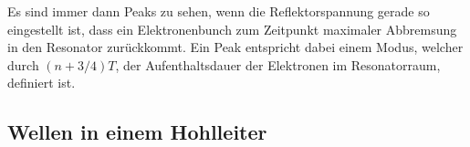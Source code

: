 Es sind immer dann Peaks zu sehen, wenn die Reflektorspannung gerade so eingestellt ist, dass ein Elektronenbunch zum Zeitpunkt maximaler Abbremsung in den Resonator zurückkommt.
Ein Peak entspricht dabei einem Modus, welcher durch $(n+3/4)T$, der Aufenthaltsdauer der Elektronen im Resonatorraum, definiert ist.

\subsection{Wellen in einem Hohlleiter}





\cite{sample}

